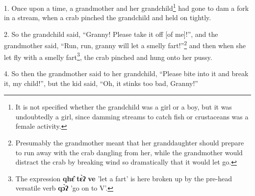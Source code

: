 \setcounter{footnote}{0}

1. Once upon a time, a grandmother and her grandchild\footnote{It is not specified whether the grandchild was a girl or a boy, but it was undoubtedly a girl, since damming streams to catch fish or crustaceans was a female activity.} had gone to dam a fork
in a stream, when a crab pinched the grandchild and held on tightly.

2. So the grandchild said, ``Granny! Please take it off [of me]!'', and the grandmother
said, ``Run, run, granny will let a smelly fart!''\footnote{Presumably the grandmother meant that her granddaughter should prepare to run away with the crab dangling from her, while the grandmother would distract the crab by breaking wind so dramatically that it would let go.} and then when she let fly
with a smelly fart\footnote{The expression \textbf{qhɛ̂} \textbf{tɛ̀ʔ} \textbf{ve} 'let a fart' is here broken up by the pre-head versatile verb \textbf{qɔ̀ʔ} 'go on to V'.}, the crab pinched and hung onto her pussy.

4. So then the grandmother said to her grandchild, ``Please bite into it and break
it, my child!'', but the kid said, ``Oh, it stinks too bad, Granny!''


